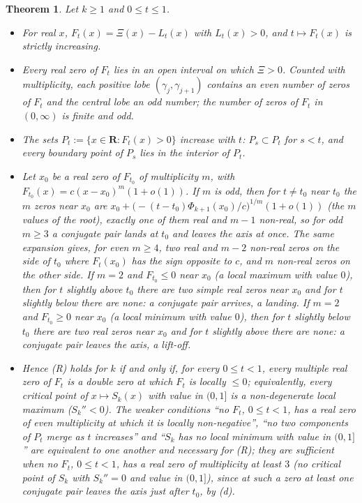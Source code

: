\documentclass[11pt]{article}
\theoremstyle{plain}
\newtheorem{theorem}{Theorem}[section]
\theoremstyle{definition}
\theoremstyle{remark}
\newcommand{\R}{\mathbf{R}}
\begin{document}
\begin{theorem}\label{thm:real}
Let $k \ge 1$ and $0 \le t \le 1$.
\begin{itemize}
\item[(a)] For real $x$, $F_t(x) = \Xi(x) - L_t(x)$ with $L_t(x) > 0$, and
$t \mapsto F_t(x)$ is strictly increasing.
\item[(b)] Every real zero of $F_t$ lies in an open interval on which $\Xi > 0$.
Counted with multiplicity, each positive lobe $(\gamma_j, \gamma_{j+1})$
contains an even number of zeros of $F_t$ and the central lobe an odd number;
the number of zeros of $F_t$ in $(0,\infty)$ is finite and odd.
\item[(c)] The sets $P_t := \{x \in \R : F_t(x) > 0\}$ increase with $t$:
$P_s \subset P_t$ for $s < t$, and every boundary point of $P_s$ lies in the
interior of $P_t$.
\item[(d)] Let $x_0$ be a real zero of $F_{t_0}$ of multiplicity $m$, with
$F_{t_0}(x) = c(x - x_0)^m(1 + o(1))$. If $m$ is odd, then for $t \ne t_0$ near $t_0$ the $m$ zeros near $x_0$ are
$x_0 + \bigl(-(t - t_0)\Phi_{k+1}(x_0)/c\bigr)^{1/m}(1 + o(1))$ (the $m$
values of the root), exactly one of them real and $m - 1$ non-real, so for odd
$m \ge 3$ a conjugate pair lands at $t_0$ and leaves the axis at once. The same
expansion gives, for even $m \ge 4$, two real and $m - 2$ non-real zeros on the
side of $t_0$ where $F_t(x_0)$ has the sign opposite to $c$, and $m$ non-real
zeros on the other side. If $m = 2$ and $F_{t_0} \le 0$ near $x_0$ (a local
maximum with value $0$), then for $t$ slightly above $t_0$ there are two simple
real zeros near $x_0$ and for $t$ slightly below there are none: a conjugate
pair arrives, a \emph{landing}. If $m = 2$ and $F_{t_0} \ge 0$ near $x_0$ (a
local minimum with value $0$), then for $t$ slightly below $t_0$ there are two
real zeros near $x_0$ and for $t$ slightly above there are none: a conjugate
pair leaves the axis, a \emph{lift-off}.
\item[(e)] Hence (R) holds for $k$ if and only if, for every $0 \le t < 1$,
every multiple real zero of $F_t$ is a double zero at which $F_t$ is locally
$\le 0$; equivalently, every critical point of $x \mapsto S_k(x)$ with value in
$(0,1]$ is a non-degenerate local maximum ($S_k'' < 0$). The weaker conditions
``no $F_t$, $0 \le t < 1$, has a real zero of even multiplicity at which it is
locally non-negative'', ``no two components of $P_t$ merge as $t$ increases''
and ``$S_k$ has no local minimum with value in $(0,1]$'' are equivalent to one
another and necessary for (R); they are sufficient when no $F_t$,
$0 \le t < 1$, has a real zero of multiplicity at least $3$ (no critical point
of $S_k$ with $S_k'' = 0$ and value in $(0,1]$), since at such a zero at least
one conjugate pair leaves the axis just after $t_0$, by (d).
\end{itemize}
\end{theorem}
\end{document}
